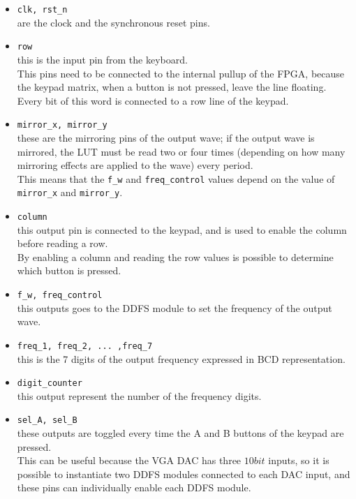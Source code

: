 \begin{itemize}

    \item \texttt{clk, rst\_n} \\
    are the clock and the synchronous reset pins.

    \item \texttt{row} \\
    this is the input pin from the keyboard. \\
    This pins need to be connected to the internal pullup of the FPGA, because the keypad matrix, when a button is not pressed, leave the line floating. \\
    Every bit of this word is connected to a row line of the keypad.

    \item \texttt{mirror\_x, mirror\_y} \\
    these are the mirroring pins of the output wave; if the output wave is mirrored, the LUT must be read two or four times (depending on how many mirroring effects are applied to the wave) every period. \\
    This means that the \texttt{f\_w} and \texttt{freq\_control} values depend on the value of \texttt{mirror\_x} and \texttt{mirror\_y}.
    

    \item \texttt{column} \\
    this output pin is connected to the keypad, and is used to enable the column before reading a row. \\
    By enabling a column and reading the row values is possible to determine which button is pressed.

    \item \texttt{f\_w, freq\_control} \\
    this outputs goes to the DDFS module to set the frequency of the output wave.

    \item \texttt{freq\_1, freq\_2, ... ,freq\_7} \\
    this is the 7 digits of the output frequency expressed in BCD representation.

    \item \texttt{digit\_counter} \\
    this output represent the number of the frequency digits.

    \item \texttt{sel\_A, sel\_B} \\
    these outputs are toggled every time the A and B buttons of the keypad are pressed. \\
    This can be useful because the VGA DAC has three \(10 bit\) inputs, so it is possible to instantiate two DDFS modules connected to each DAC input, and these pins can individually enable each DDFS module.


\end{itemize}
